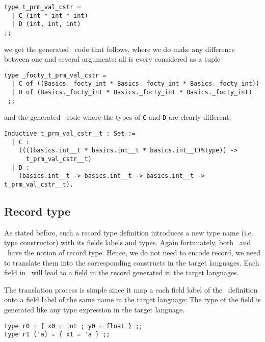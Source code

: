 {\footnotesize
\begin{lstlisting}[title=Value constructor parameterised by
  ``several'' arguments (2)]
type t_prm_val_cstr =
  | C (int * int * int)
  | D (int, int, int)
;;
\end{lstlisting}
}
we get the generated \ocaml\ code that follows, where we do make any
difference between one and several arguments: all is every considered
as a tuple

{\footnotesize
\begin{lstlisting}[language=MyOCaml,
                   title=Value constructor parameterised by
                   ``several'' arguments in \ocaml\ (2)]
type _focty_t_prm_val_cstr = 
  | C of ((Basics._focty_int * Basics._focty_int * Basics._focty_int))
  | D of (Basics._focty_int * Basics._focty_int * Basics._focty_int)
 ;;
\end{lstlisting}
}
and the generated \coq\ code where the types of {\tt C} and {\tt D}
are clearly different:

{\footnotesize
\begin{lstlisting}[language=MyCoq,
                   title=Value constructor parameterised by
                   ``several'' arguments in \coq\ (2)]
Inductive t_prm_val_cstr__t : Set := 
  | C :
    ((((basics.int__t * basics.int__t * basics.int__t)%type)) ->
      t_prm_val_cstr__t)
  | D :
    (basics.int__t -> basics.int__t -> basics.int__t -> t_prm_val_cstr__t).
\end{lstlisting}
}



\subsection{Record type}
As stated before, such a record type definition introduces a new type
name (i.e. type constructor) with its fields labels and types. Again
fortunately, both \ocaml\ and \coq\ have the notion of record
type. Hence, we do not need to encode record, we need to translate them
into the corresponding constructs in the target languages. Each field
in \focalize\ will lead to a field in the record generated in the
target languages.

The translation process is simple since it map a each field label of
the \focalize\ definition onto a field label of the same name in the
target language: The type of the field is generated like any type
expression in the target language.

{\footnotesize
\begin{lstlisting}[title=Record type definitions in \focalize]
type r0 = { x0 = int ; y0 = float } ;;
type r1 ('a) = { x1 = 'a } ;;
\end{lstlisting}
}

